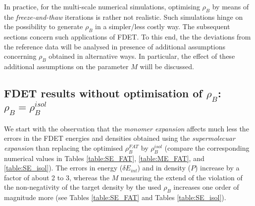 \documentclass[journal=jctcce,manuscript=article]{achemso}
\begin{document}
In practice, for the multi-scale numerical simulations,  optimising 
$\rho_B$ by means of the {\it freeze-and-thaw} iterations is rather not realistic. Such simulations hinge on the possibility to generate $\rho_B$ 
in a simpler/less costly way. 
The subsequent sections concern such applications of FDET. 
To this end, the the deviations from the reference data will be analysed in presence of additional assumptions concerning $\rho_B$ obtained in alternative ways. In particular, the effect of these additional assumptions on the parameter $M$ wiill be discussed.

\subsection{FDET results without optimisation of $\rho_B$: $\rho_B=\rho_B^{isol}$}

We start with 
the observation that the {\it  monomer expansion} affects much less the errors in the FDET energies  and densities obtained using the {\it supermolecuar expansion}
than replacing the optimised $\rho_B^{FAT}$ by $\rho_B^{isol}$ (compare the corresponding numerical values in 
Tables \ref{table:SE_FAT},  \ref{table:ME_FAT}, and \ref{table:SE_isol}). 
The errors in energy ($\delta E_{int}$) and in density ($P$) increase   by a factor of about 2 to 3, whereas the $M$  measuring the extend of the violation of the non-negativity of the target density by the used $\rho_B$ increases  one order of magnitude more (see Tables \ref{table:SE_FAT} and Tables \ref{table:SE_isol}). 
\end{document}
